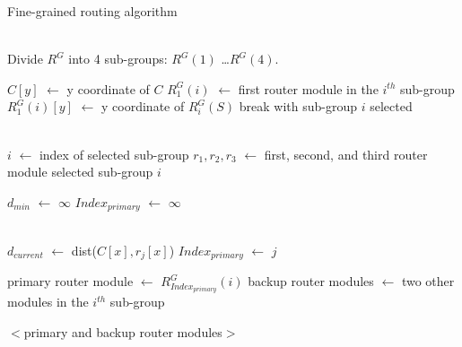 \begin{algorithm}
\caption{Fine-grained routing algorithm}
\label{alg:fgr}
\begin{algorithmic}[1]
 \\ 
\State Divide $R^G$ into 4 sub-groups: $R^G(1)$ \ldots $R^G(4)$.

 
\label{first:begin}
    \State $C[y]$ $\leftarrow$ y coordinate of $C$
    \State $R^G_{1}(i)$ $\leftarrow$ first router module in the $i^{th}$ sub-group
    \State $R^G_{1}(i)[y]$ $\leftarrow$ y coordinate of $R^G_{i}(S)$
    \State break with sub-group $i$ selected
    \EndIf
\EndFor
\label{first:end}

\\ 

\State $i$ $\leftarrow$ index of selected sub-group
\label{second:begin}
\State $r_1, r_2, r_3$ $\leftarrow$ first, second, and third router module 
\State \hspace{\algorithmicindent} selected sub-group $i$

\State $d_{min}$ $\leftarrow$ $\infty$ 
\State $Index_{primary}$ $\leftarrow$ $\infty$

\\

    \State $d_{current}$ $\leftarrow$ dist($C[x], r_j[x]$) 
        \State $Index_{primary}$ $\leftarrow$ $j$
        \EndIf

\EndFor

    \State primary router module $\leftarrow$ $R^G_{Index_{primary}}(i)$
    \State backup router modules $\leftarrow$ 
     two other modules in the $i^{th}$ sub-group

    \Return $<$primary and backup router modules$>$ \\ 

\label{second:end}

\EndProcedure
\\
\end{algorithmic}
\end{algorithm}

